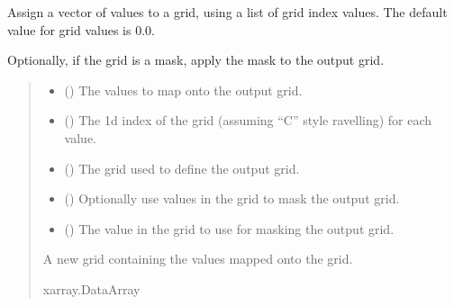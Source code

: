 \documentclass[letterpaper,10pt,english]{sphinxmanual}
\begin{document}
\begin{fulllineitems}
\label{\detokenize{kriging:glomar_gridding.grid.assign_to_grid}}
\pysigstartsignatures
\pysiglinewithargsret
{}
{\sphinxparamcomma {}\sphinxparamcomma {}\sphinxparamcomma {}\sphinxparamcomma {}}
{}
\pysigstopsignatures
\sphinxAtStartPar
Assign a vector of values to a grid, using a list of grid index values. The
default value for grid values is 0.0.

\sphinxAtStartPar
Optionally, if the grid is a mask, apply the mask to the output grid.
\begin{quote}\begin{description}
\begin{itemize}
\item {}
\sphinxAtStartPar
{} () \textendash{} The values to map onto the output grid.

\item {}
\sphinxAtStartPar
{} () \textendash{} The 1d index of the grid (assuming “C” style ravelling) for each value.

\item {}
\sphinxAtStartPar
{} () \textendash{} The grid used to define the output grid.

\item {}
\sphinxAtStartPar
{} () \textendash{} Optionally use values in the grid to mask the output grid.

\item {}
\sphinxAtStartPar
{} () \textendash{} The value in the grid to use for masking the output grid.

\end{itemize}

\sphinxAtStartPar
{} \textendash{} A new grid containing the values mapped onto the grid.

\sphinxAtStartPar
xarray.DataArray

\end{description}\end{quote}

\end{fulllineitems}
\end{document}
